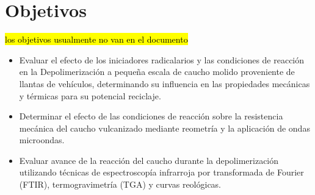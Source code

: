 \chapter{Objetivos}

\hl{los objetivos usualmente no van en el documento}

\begin{itemize}
    \item Evaluar el efecto de los iniciadores radicalarios y las condiciones de reacción en la Depolimerización a pequeña escala de caucho molido proveniente de llantas de vehículos, determinando su influencia en las propiedades mecánicas y térmicas para su potencial reciclaje.
    \item Determinar el efecto de las condiciones de reacción sobre la resistencia mecánica del caucho vulcanizado mediante reometría y la aplicación de ondas microondas.
    \item Evaluar avance de la reacción del caucho durante la depolimerización utilizando técnicas de espectroscopía infrarroja por transformada de Fourier (FTIR), termogravimetría (TGA) y curvas reológicas.
\end{itemize}

